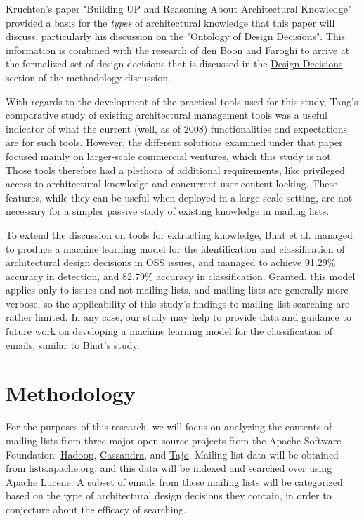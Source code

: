 \documentclass[a4paper, 12pt]{article}
\begin{document}
	Kruchten's paper "Building UP and Reasoning About Architectural Knowledge" provided a basis for the \textit{types} of architectural knowledge that this paper will discuss, particularly his discussion on the "Ontology of Design Decisions"\autocite{kruchten}. This information is combined with the research of den Boon\autocite{denboon} and Faroghi\autocite{faroghi} to arrive at the formalized set of design decisions that is discussed in the \hyperref[sec:design-decisions]{Design Decisions} section of the methodology discussion.
	
	With regards to the development of the practical tools used for this study, Tang's comparative study of existing architectural management tools\autocite{tang} was a useful indicator of what the current (well, as of 2008) functionalities and expectations are for such tools. However, the different solutions examined under that paper focused mainly on larger-scale commercial ventures, which this study is not. Those tools therefore had a plethora of additional requirements, like privileged access to architectural knowledge and concurrent user content locking. These features, while they can be useful when deployed in a large-scale setting, are not necessary for a simpler passive study of existing knowledge in mailing lists.
	
	To extend the discussion on tools for extracting knowledge, Bhat et al. managed to produce a machine learning model for the identification and classification of architectural design decisions in OSS issues, and managed to achieve 91.29\% accuracy in detection, and 82.79\% accuracy in classification\autocite{bhat}. Granted, this model applies only to issues and not mailing lists, and mailing lists are generally more verbose, so the applicability of this study's findings to mailing list searching are rather limited. In any case, our study may help to provide data and guidance to future work on developing a machine learning model for the classification of emails, similar to Bhat's study.

\section{Methodology}
	For the purposes of this research, we will focus on analyzing the contents of mailing lists from three major open-source projects from the Apache Software Foundation: \href{https://hadoop.apache.org/}{Hadoop}, \href{https://cassandra.apache.org}{Cassandra}, and \href{https://attic.apache.org/projects/tajo.html}{Tajo}. Mailing list data will be obtained from \href{https://lists.apache.org/}{lists.apache.org}, and this data will be indexed and searched over using \href{https://lucene.apache.org/}{Apache Lucene}. A subset of emails from these mailing lists will be categorized based on the type of architectural design decisions they contain, in order to conjecture about the efficacy of searching.
	
\end{document}
